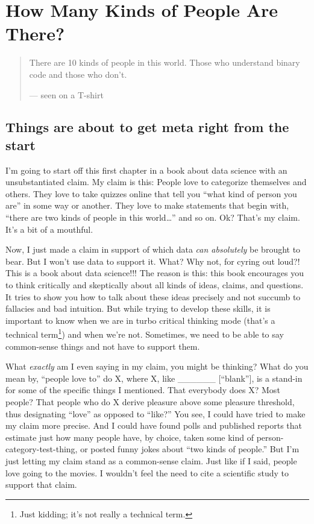 \documentclass[]{book}
\let\rmarkdownfootnote\footnote%
\def\footnote{\protect\rmarkdownfootnote}
\begin{document}
\hypertarget{how-many-kinds-of-people-are-there}{%
\chapter{How Many Kinds of People Are There?}\label{how-many-kinds-of-people-are-there}}

\begin{quote}
There are 10 kinds of people in this world.
Those who understand binary code and those who don't.

--- seen on a T-shirt
\end{quote}

\hypertarget{things-are-about-to-get-meta-right-from-the-start}{%
\section*{Things are about to get meta right from the start}\label{things-are-about-to-get-meta-right-from-the-start}}

I'm going to start off this first chapter in a book about data science with an unsubstantiated claim. My claim is this: People love to categorize themselves and others. They love to take quizzes online that tell you ``what kind of person you are'' in some way or another. They love to make statements that begin with, ``there are two kinds of people in this world\ldots{}'' and so on. Ok? That's my claim. It's a bit of a mouthful.

Now, I just made a claim in support of which data \emph{can absolutely} be brought to bear. But I won't use data to support it. What? Why not, for cyring out loud?! This is a book about data science!!! The reason is this: this book encourages you to think critically and skeptically about all kinds of ideas, claims, and questions. It tries to show you how to talk about these ideas precisely and not succumb to fallacies and bad intuition. But while trying to develop these skills, it is important to know when we are in turbo critical thinking mode (that's a technical term\footnote{Just kidding; it's not really a technical term.}) and when we're not. Sometimes, we need to be able to say common-sense things and not have to support them.

What \emph{exactly} am I even saying in my claim, you might be thinking? What do you mean by, ``people love to'' do X, where X, like \_\_\_\_\_\_ {[}``blank''{]}, is a stand-in for some of the specific things I mentioned. That everybody does X? Most people? That people who do X derive pleasure above some pleasure threshold, thus designating ``love'' as opposed to ``like?'' You see, I could have tried to make my claim more precise. And I could have found polls and published reports that estimate just how many people have, by choice, taken some kind of person-category-test-thing, or posted funny jokes about ``two kinds of people.'' But I'm just letting my claim stand as a common-sense claim. Just like if I said, people love going to the movies. I wouldn't feel the need to cite a scientific study to support that claim.
\end{document}
